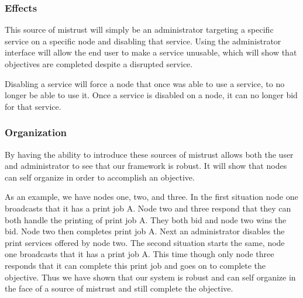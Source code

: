 \documentclass[draftclsnofoot, onecolumn, compsoc, 10pt]{IEEEtran}
\begin{document}

\subsubsection{Effects}
This source of mistrust will simply be an administrator targeting a specific service on a specific node and disabling that service. Using the administrator interface will allow the end user to make a service unusable, which will show that objectives are completed despite a disrupted service.

Disabling a service will force a node that once was able to use a service, to no longer be able to use it. Once a service is disabled on a node, it can no longer bid for that service.

\subsubsection{Organization}
By having the ability to introduce these sources of mistrust allows both the user and administrator to see that our framework is robust. It will show that nodes can self organize in order to accomplish an objective.

As an example, we have nodes one, two, and three. In the first situation node one broadcasts that it has a print job A. Node two and three respond that they can both handle the printing of print job A. They both bid and node two wins the bid. Node two then completes print job A. Next an administrator disables the print services offered by node two. The second situation starts the same, node one broadcasts that it has a print job A. This time though only node three responds that it can complete this print job and goes on to complete the objective. Thus we have shown that our system is robust and can self organize in the face of a source of mistrust and still complete the objective.
			
\end{document}
